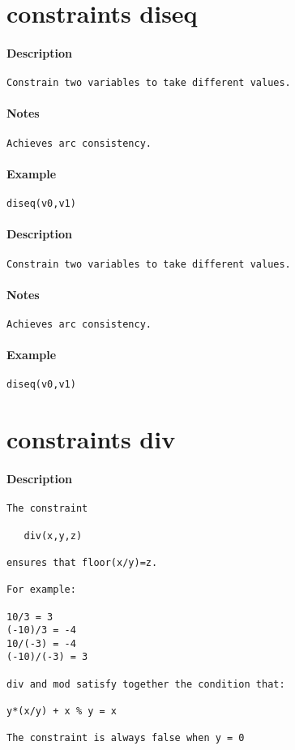 \section{constraints diseq}
\paragraph{Description}
{\footnotesize
\begin{verbatim}
Constrain two variables to take different values.
\end{verbatim}
}
\paragraph{Notes}
{\footnotesize
\begin{verbatim}
Achieves arc consistency.
\end{verbatim}
}
\paragraph{Example}
{\footnotesize
\begin{verbatim}
diseq(v0,v1)
\end{verbatim}
}
\paragraph{Description}
{\footnotesize
\begin{verbatim}
Constrain two variables to take different values.
\end{verbatim}
}
\paragraph{Notes}
{\footnotesize
\begin{verbatim}
Achieves arc consistency.
\end{verbatim}
}
\paragraph{Example}
{\footnotesize
\begin{verbatim}
diseq(v0,v1)
\end{verbatim}
}
\section{constraints div}
\paragraph{Description}
{\footnotesize
\begin{verbatim}
The constraint

   div(x,y,z)

ensures that floor(x/y)=z.

For example:

10/3 = 3
(-10)/3 = -4
10/(-3) = -4
(-10)/(-3) = 3

div and mod satisfy together the condition that:

y*(x/y) + x % y = x

The constraint is always false when y = 0
\end{verbatim}
}
